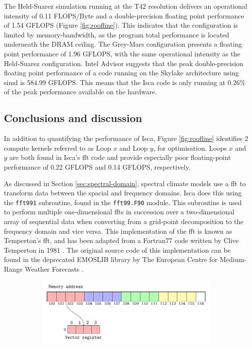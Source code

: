 \documentclass[a4paper,11pt]{report}
\begin{document}
The Held-Suarez simulation running at the T42 resolution delivers an operational intensity of 0.11 FLOPS/Byte and a double-precision floating point performance of 1.54 GFLOPS (Figure \ref{fig:roofline}). This indicates that the configuration is limited by memory-bandwidth, as the program total performance is located underneath the DRAM ceiling. The Grey-Mars configuration presents a floating point performance of 1.96 GFLOPS, with the same operational intensity as the Held-Suarez configuration. Intel Advisor suggests that the peak double-precision floating point performance of a code running on the Skylake architecture using \gls{simd} is 584.99 GFLOPS. This means that the Isca code is only running at 0.26\% of the peak performance available on the hardware.

\subsection{Conclusions and discussion}
In addition to quantifying the performance of Isca, Figure \ref{fig:roofline} identifies 2 compute kernels referred to as Loop $x$ and Loop $y$, for optimisation. Loops $x$ and $y$ are both found in Isca's \gls{fft} code and provide especially poor floating-point performance of 0.22 GFLOPS and 0.14 GFLOPS, respectively. 
\par
As discussed in Section \ref{sec:spectral-domain}, spectral climate models use a \gls{fft} to transform data between the spacial and frequency domains. Isca does this using the \texttt{fft991} subroutine, found in the \texttt{fft99.F90} module. This subroutine is used to perform multiple one-dimensional \gls{fft}s in succession over a two-dimensional array of sequential data when converting from a grid-point decomposition to the frequency domain and vice versa. This implementation of the \gls{fft} is known as Temperton's \gls{fft}, and has been adapted from a Fortran77 code written by Clive Temperton in 1981 \cite{temperton1980fft}. The original source code of this implementation can be found in the deprecated EMOSLIB library by The European Centre for Medium-Range Weather Forecasts \cite{ecmwf2015emoslib}.
\par
\begin{figure}[htbp]
\centering
\begin{subfigure}[b]{1\textwidth}
\centering
   \includegraphics[width=0.80\linewidth]{img/tikz-img/vector_registers_contiguous/vector_registers.pdf}
   \caption{}
   \label{fig:Ng1} 
\end{subfigure}
\end{figure}
\end{document}
